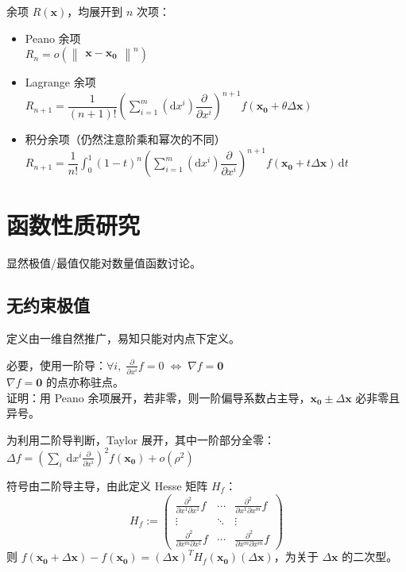 \documentclass[12pt, a4paper, UTF8, openany]{ctexbook}
\newcommand{\dif}{\mathrm{d}}
\newcommand{\difx}{\,\mathrm{d}x}
\newcommand{\mat}[1]{\mathbf{#1}}
\newcommand{\len}[1]{\begin{Vmatrix}#1\end{Vmatrix}}%
\begin{document}
    余项 $R(\mat{x})$，均展开到 $n$ 次项：
    \begin{itemize}
        \item Peano 余项 \\
            $R_n = o(\len{\mat{x - x_0}}^{n})$
        \item Lagrange 余项 \\
            $R_{n + 1} = \dfrac{1}{(n + 1)!}(\sum_{i = 1}^{m} (\dif x^i) \dfrac{\partial}{\partial x^i})^{n + 1} f(\mat{x_0} + \theta\Delta\mat{x})$
        \item 积分余项（仍然注意阶乘和幂次的不同） \\
            $R_{n + 1} = \dfrac{1}{n!}\int_{0}^{1} (1 - t)^n (\sum_{i = 1}^{m} (\dif x^i) \dfrac{\partial}{\partial x^i})^{n + 1} f(\mat{x_0} + t \Delta\mat{x}) \,\dif t$
    \end{itemize}

    \section{函数性质研究}
    显然极值/最值仅能对数量值函数讨论。

        \subsection{无约束极值}
        定义由一维自然推广，易知只能对内点下定义。

        必要，使用一阶导：$\forall i, \; \frac{\partial}{\partial x^i} f = 0 \; \iff \; \nabla f = \mat{0}$ \\
        $\nabla f = \mat{0}$ 的点亦称驻点。\\
        证明：用 Peano 余项展开，若非零，则一阶偏导系数占主导，$\mat{x_0} \pm \Delta\mat{x}$ 必非零且异号。

        为利用二阶导判断，Taylor 展开，其中一阶部分全零：$\Delta f = (\sum_{i} \difx^i \frac{\partial}{\partial x^i})^2 f(\mat{x_0}) + o(\rho^2)$

        符号由二阶导主导，由此定义 Hesse 矩阵 $H_f$：
        $$H_f := \begin{pmatrix}
            \frac{\partial^2}{\partial x^1 \partial x^1} f & \cdots & \frac{\partial^2}{\partial x^1 \partial x^m} f \\
            \vdots & \ddots & \vdots \\
            \frac{\partial^2}{\partial x^m \partial x^1} f & \cdots & \frac{\partial^2}{\partial x^m \partial x^m} f
        \end{pmatrix}$$
        则 $f(\mat{x_0} + \Delta\mat{x}) - f(\mat{x_0}) = (\Delta\mat{x})^T H_f(\mat{x_0}) (\Delta\mat{x})$，为关于 $\Delta\mat{x}$ 的二次型。
\end{document}
